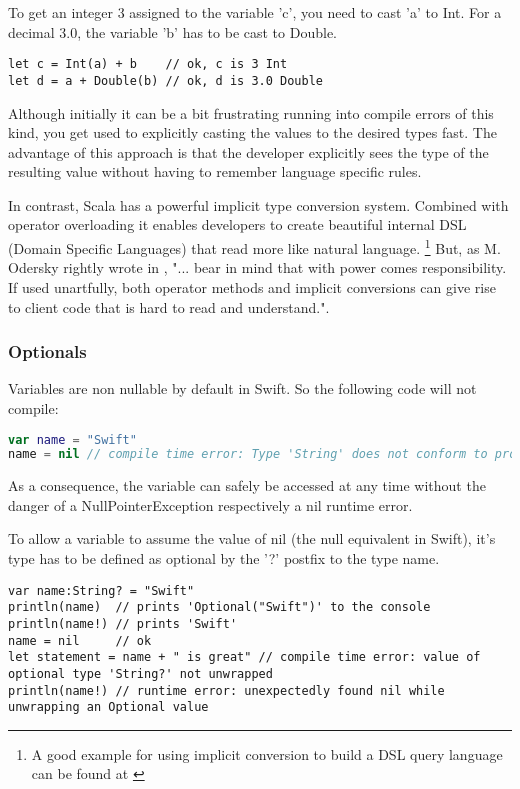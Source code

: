 To get an integer 3 assigned to the variable 'c', you need to cast 'a' to Int. For a decimal 3.0, the variable 'b' has to be cast to Double.

\begin{lstlisting}[frame=none]
let c = Int(a) + b    // ok, c is 3 Int
let d = a + Double(b) // ok, d is 3.0 Double
\end{lstlisting}

Although initially it can be a bit frustrating running into compile errors of this kind, you get used to explicitly casting the values to the desired types fast. The advantage of this approach is that the developer explicitly sees the type of the resulting value without having to remember language specific rules.

In contrast, Scala has a powerful implicit type conversion system. Combined with operator overloading it enables developers to create beautiful internal DSL (Domain Specific Languages) that read more like natural language. \footnote{A good example for using implicit conversion to build a DSL query language can be found at \cite{scala-dsl-example}}
But, as M. Odersky rightly wrote in \cite[Chapter 6.13]{scala-book}, "... bear in mind that with power comes responsibility. If used unartfully, both operator methods and implicit conversions can give rise to client code that is hard to read and understand.".

\subsubsection{Optionals}

Variables are non nullable by default in Swift. So the following code will not compile:

\begin{lstlisting}[frame=none, language=swift]
var name = "Swift"
name = nil // compile time error: Type 'String' does not conform to protocol 'NilLiteralConvertible'
\end{lstlisting}

As a consequence, the variable can safely be accessed at any time without the danger of a NullPointerException respectively a nil runtime error.

To allow a variable to assume the value of nil (the null equivalent in Swift), it's type has to be defined as optional by the '?' postfix to the type name.

\begin{lstlisting}[frame=none]
var name:String? = "Swift"
println(name)  // prints 'Optional("Swift")' to the console
println(name!) // prints 'Swift'
name = nil     // ok
let statement = name + " is great" // compile time error: value of optional type 'String?' not unwrapped
println(name!) // runtime error: unexpectedly found nil while unwrapping an Optional value
\end{lstlisting}

